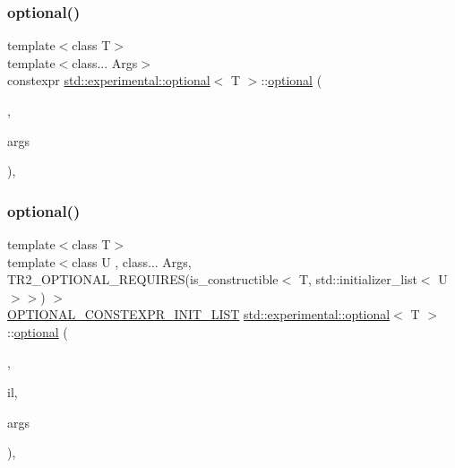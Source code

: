 \subsubsection{\texorpdfstring{optional()}{optional()}\hspace{0.1cm}{\footnotesize\ttfamily [7/8]}}
{\footnotesize\ttfamily template$<$class T$>$ \\
template$<$class... Args$>$ \\
constexpr \hyperlink{classstd_1_1experimental_1_1optional}{std\+::experimental\+::optional}$<$ T $>$\+::\hyperlink{classstd_1_1experimental_1_1optional}{optional} (\begin{DoxyParamCaption}\item[{\hyperlink{structstd_1_1experimental_1_1in__place__t}{in\+\_\+place\+\_\+t}}]{,  }\item[{Args \&\&...}]{args }\end{DoxyParamCaption})\hspace{0.3cm}{\ttfamily [inline]}, {\ttfamily [explicit]}}

\mbox{\label{classstd_1_1experimental_1_1optional_a52252028f9d99a680f7059ff48593985}} 
\subsubsection{\texorpdfstring{optional()}{optional()}\hspace{0.1cm}{\footnotesize\ttfamily [8/8]}}
{\footnotesize\ttfamily template$<$class T$>$ \\
template$<$class U , class... Args, T\+R2\+\_\+\+O\+P\+T\+I\+O\+N\+A\+L\+\_\+\+R\+E\+Q\+U\+I\+R\+E\+S(is\+\_\+constructible$<$ T, std\+::initializer\+\_\+list$<$ U $>$$>$) $>$ \\
\hyperlink{optional_8h_a7399114ed1c146a67741cdd1f681fcb5}{O\+P\+T\+I\+O\+N\+A\+L\+\_\+\+C\+O\+N\+S\+T\+E\+X\+P\+R\+\_\+\+I\+N\+I\+T\+\_\+\+L\+I\+ST} \hyperlink{classstd_1_1experimental_1_1optional}{std\+::experimental\+::optional}$<$ T $>$\+::\hyperlink{classstd_1_1experimental_1_1optional}{optional} (\begin{DoxyParamCaption}\item[{\hyperlink{structstd_1_1experimental_1_1in__place__t}{in\+\_\+place\+\_\+t}}]{,  }\item[{std\+::initializer\+\_\+list$<$ U $>$}]{il,  }\item[{Args \&\&...}]{args }\end{DoxyParamCaption})\hspace{0.3cm}{\ttfamily [inline]}, {\ttfamily [explicit]}}

